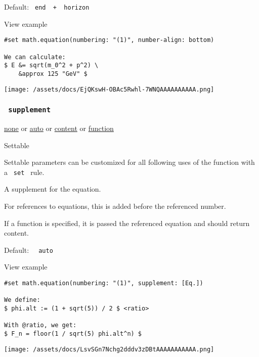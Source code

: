 Default: \texttt{\ end\ }{\texttt{\ +\ }}\texttt{\ horizon\ }


View example

\begin{verbatim}
#set math.equation(numbering: "(1)", number-align: bottom)

We can calculate:
$ E &= sqrt(m_0^2 + p^2) \
    &approx 125 "GeV" $
\end{verbatim}

\texttt{[image: /assets/docs/EjQKswH-OBAc5Rwhl-7WNQAAAAAAAAAA.png]}

\subsubsection{\texorpdfstring{\texttt{\ supplement\ }}{ supplement }}\label{parameters-supplement}

\href{/docs/reference/foundations/none/}{none} {or}
\href{/docs/reference/foundations/auto/}{auto} {or}
\href{/docs/reference/foundations/content/}{content} {or}
\href{/docs/reference/foundations/function/}{function}

{{ Settable }}

\label{parameters-supplement-settable-tooltip}
Settable parameters can be customized for all following uses of the
function with a \texttt{\ set\ } rule.

A supplement for the equation.

For references to equations, this is added before the referenced number.

If a function is specified, it is passed the referenced equation and
should return content.

Default: \texttt{\ }{\texttt{\ auto\ }}\texttt{\ }


View example

\begin{verbatim}
#set math.equation(numbering: "(1)", supplement: [Eq.])

We define:
$ phi.alt := (1 + sqrt(5)) / 2 $ <ratio>

With @ratio, we get:
$ F_n = floor(1 / sqrt(5) phi.alt^n) $
\end{verbatim}

\texttt{[image: /assets/docs/LsvSGn7Nchg2dddv3zDBtAAAAAAAAAAA.png]}

